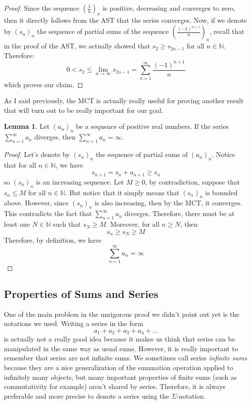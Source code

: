 \documentclass[10pt]{article}
\newcommand{\N}{\mathbb{N}}
\theoremstyle{definition}
\newtheorem{lemma}{Lemma}
\begin{document}
\begin{proof}
    Since the sequence $(\frac{1}{n})_n$ is positive, decreasing and converges to zero, then it directly follows from the AST that the series converges. Now, if we denote by $(s_n)_n$ the sequence of partial sums of the sequence $(\frac{(-1)^{n+1}}{n})_n$, recall that in the proof of the AST, we actually showed that $s_2 \geq s_{2n-1}$ for all $n \in \N$. Therefore:
    $$ 0 < s_2 \leq \lim_{n \rightarrow \infty}s_{2n-1} = \sum_{n=1}^{\infty}\frac{(-1)^{n+1}}{n} $$
    which proves our claim.
\end{proof}

As I said previously, the MCT is actually really useful for proving another result that will turn out to be really important for our goal.

\begin{lemma}
    Let $(a_n)_n$ be a sequence of positive real numbers. If the series $\sum_{n=1}^{\infty}a_n$ diverges, then $\sum_{n=1}^{\infty}a_n = \infty$.
\end{lemma}

\begin{proof}
    Let's denote by $(s_n)_n$ the sequence of partial sums of $(a_n)_n$. Notice that for all $n \in \N$, we have
    $$s_{n+1} = s_n + a_{n+1} \geq s_n$$
    so $(s_n)_n$ is an increasing sequence. Let $M \geq 0$, by contradiction, suppose that $s_n \leq M$ for all $n \in \N$. But notice that it simply means that $(s_n)_n$ is bounded above. However, since $(s_n)_n$ is also increasing, then by the MCT, it converges. This contradicts the fact that $\sum_{n=1}^{\infty}a_n$ diverges. Therefore, there must be at least one $N \in \N$ such that $s_N \geq M$. Moreover, for all $n \geq N$, then
    $$s_n \geq s_N \geq M$$
    Therefore, by definition, we have
    $$\sum_{n=1}^{\infty}a_n = \infty$$
\end{proof}

\subsection{Properties of Sums and Series}

One of the main problem in the unrigorous proof we didn't point out yet is the notations we used. Writing a series in the form
$$a_1 + a_2 + a_3 + a_4 + ...$$
is actually not a really good idea because it makes us think that series can be manipulated in the same way as usual sums. However, it is really important to remember that series are not infinite sums. We sometimes call series \textit{infinite sums} because they are a nice generalization of the summation operation applied to infinitely many objects, but many important properties of finite sums (such as commutativity for example) aren't shared by series. Therefore, it is always preferable and more precise to denote a series using the $\Sigma$-notation.
\end{document}
